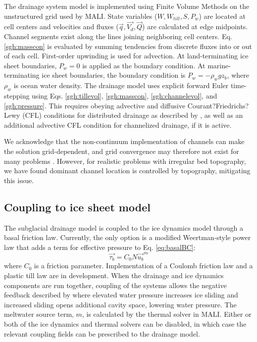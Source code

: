 The drainage system model is implemented using Finite Volume Methods on the unstructured grid used by MALI.  
State variables ($W, W_{till}, S, P_w$) are located at cell centers and 
velocities and fluxes ($\vec{q}, \vec{V_d}, \vec{Q}$) are calculated at edge midpoints.
Channel segments exist along the lines joining neighboring cell centers.
Eq. \ref{sgh:masscon} is evaluated by summing tendencies from discrete fluxes into or out of each cell.
First-order upwinding is used for advection.
At land-terminating ice sheet boundaries, $P_w=0$ is applied as the boundary condition.
At marine-terminating ice sheet boundaries, the boundary condition is $P_w=-\rho_w g z_b$, where $\rho_w$ is ocean water density.
The drainage model uses explicit forward Euler time-stepping using 
Eqs. \ref{sgh:tillevol}, \ref{sgh:masscon}, \ref{sgh:channelevol}, and \ref{sgh:pressure}.
This requires obeying advective and diffusive Courant?Friedrichs?Lewy (CFL) conditions for distributed drainage as described by \cite{Bueler2015}, 
as well as an additional advective CFL condition for channelized drainage, if it is active.

We acknowledge that the non-continuum implementation of channels can make the solution
grid-dependent, and grid convergence may therefore not exist for many problems \citep{Bueler2015}.
However, for realistic problems with irregular bed topography, we have found dominant
channel location is controlled by topography, mitigating this issue.

\subsection{Coupling to ice sheet model}
\label{sec:sgh-coupling}

The subglacial drainage model is coupled to the ice dynamics model through a basal friction law.
Currently, the only option is a modified Weertman-style power law \citep{Bindschadler1983,Hewitt2013} that adds a term for effective pressure to Eq. \ref{eq:basalBC}:
\begin{equation}
 \vec{\tau_b} = C_0 N \vec{u_b}^m
\label{sgh:frictionlaw}
\end{equation}
where $C_0$ is a friction parameter.
Implementation of a Coulomb friction law \citep{Schoof2005, Gagliardini2007}
and a plastic till law \citep{Tulaczyk2000a,Bueler2015} are in development.
When the drainage and ice dynamics components are run together,
coupling of the systems allows the negative feedback described by \citep{Hoffman2014}
where elevated water pressure increases ice sliding and increased sliding opens additional cavity space, lowering water pressure.
The meltwater source term, $m$, is calculated by the thermal solver in MALI.
Either or both of the ice dynamics and thermal solvers can be disabled, 
in which case the relevant coupling fields can be prescribed to the drainage model.

